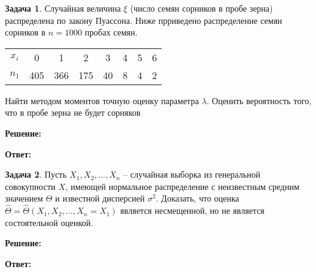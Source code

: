 \documentclass[a4paper,12pt]{article}
\theoremstyle{definition}
\newtheorem{problem}{Задача}\setlength{\parindent}{0pt}
\newenvironment{solution}
{\begin{shaded}\textbf{Решение:}\par\setlength{\parindent}{0pt}}
{\end{shaded}}
\newenvironment{answer}
{\par\noindent\textbf{Ответ:}}
{\par}
\begin{document}
\vspace{8pt}
\begin{problem}
    Случайная величина \( \xi \) (число семян сорников в пробе зерна) распределена по закону Пуассона.
    Ниже прриведено распределение семян сорников в \( n = 1000 \) пробах семян. 

    \begin{table}[H]
        \centering
        \begin{adjustbox}{max width=\textwidth}
            \begin{tabular}{c c c c c c c c}
                \toprule
                \midrule
                    \(x_i\) & 0   & 1   & 2   & 3  & 4 & 5 & 6 \\
                    \(n_1\) & 405 & 366 & 175 & 40 & 8 & 4 & 2 \\
            \bottomrule
            \end{tabular}
        \end{adjustbox}
    \end{table}  

    Найти методом моментов точную оценку параметра \( \lambda \). 
    Оценить вероятность того, что в пробе зерна не будет сорняков 

    \begin{solution}
    \end{solution}

    \begin{answer}
    \end{answer}

\end{problem}


\vspace{8pt}
\begin{problem}
    Пусть \(X_1,X_2, ... ,X_n\) – случайная выборка из генеральной совокупности \(X\), 
    имеющей нормальное распределение с неизвестным средним значением \( \Theta \) 
    и известной дисперсией \( \sigma ^ 2\). Доказать, что оценка 
    \( \hat\Theta = \hat\Theta (X_1,X_2, ... ,X_n = X_1) \) является несмещенной, 
    но не является состоятельной оценкой.

    \begin{solution}
    \end{solution}

    \begin{answer}
    \end{answer}

\end{problem}
\end{document}
